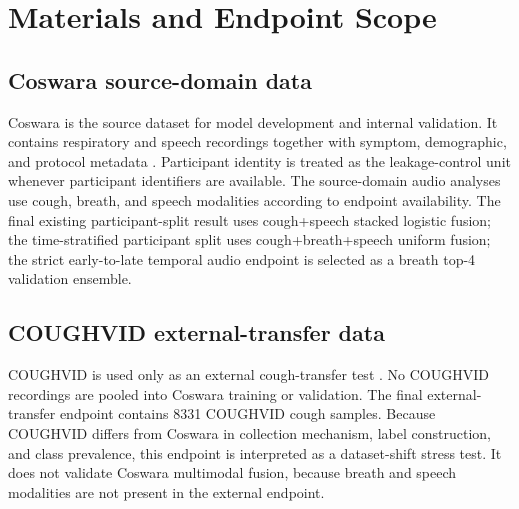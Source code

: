 \documentclass[preprint,12pt]{elsarticle}
\begin{document}
\section{Materials and Endpoint Scope}

\subsection{Coswara source-domain data}

Coswara is the source dataset for model development and internal validation. It contains respiratory and speech recordings together with symptom, demographic, and protocol metadata \citep{bhattacharya2023coswara}. Participant identity is treated as the leakage-control unit whenever participant identifiers are available. The source-domain audio analyses use cough, breath, and speech modalities according to endpoint availability. The final existing participant-split result uses cough+speech stacked logistic fusion; the time-stratified participant split uses cough+breath+speech uniform fusion; the strict early-to-late temporal audio endpoint is selected as a breath top-4 validation ensemble.

\subsection{COUGHVID external-transfer data}

COUGHVID is used only as an external cough-transfer test \citep{orlandic2021coughvid}. No COUGHVID recordings are pooled into Coswara training or validation. The final external-transfer endpoint contains 8331 COUGHVID cough samples. Because COUGHVID differs from Coswara in collection mechanism, label construction, and class prevalence, this endpoint is interpreted as a dataset-shift stress test. It does not validate Coswara multimodal fusion, because breath and speech modalities are not present in the external endpoint.
\end{document}

